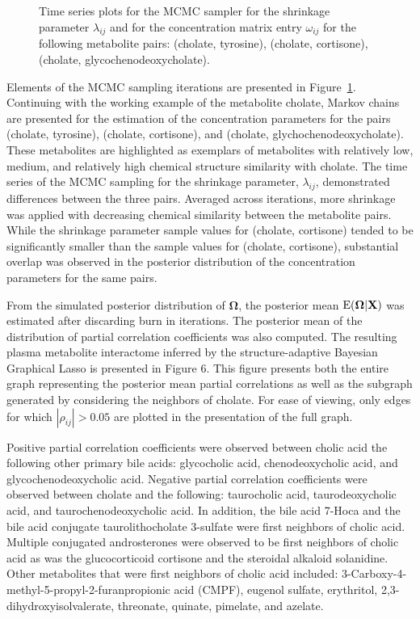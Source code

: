 \begin{figure}[h!]
	\caption[Add caption]{Time series plots for the MCMC sampler for the shrinkage parameter $\lambda_{ij}$ and for the concentration matrix entry $\omega_{ij}$ for the following metabolite pairs: (cholate, tyrosine), (cholate, cortisone), (cholate, glycochenodeoxycholate).  \label{fig:mcmc} }
\end{figure}

Elements of the MCMC sampling iterations are presented in Figure~\ref{fig:mcmc}. Continuing with the working example of the metabolite cholate, Markov chains are presented for the estimation of the concentration parameters for the pairs (cholate, tyrosine), (cholate, cortisone), and (cholate, glychochenodeoxycholate). These metabolites are highlighted as exemplars of metabolites with relatively low, medium, and relatively high chemical structure similarity with cholate. The time series of the MCMC sampling for the shrinkage parameter, $\lambda_{ij}$, demonstrated differences between the three pairs. Averaged across iterations, more shrinkage was applied with decreasing chemical similarity between the metabolite pairs. While the shrinkage parameter sample values for (cholate, cortisone) tended to be significantly smaller than the sample values for (cholate, cortisone), substantial overlap was observed in the posterior distribution of the concentration parameters for the same pairs.

From the simulated posterior distribution of $\boldsymbol{\Omega}$, the posterior mean $\operatorname{E}(\boldsymbol{\Omega}|\textbf{X})$ was estimated after discarding burn in iterations. The posterior mean of the distribution of partial correlation coefficients was also computed. The resulting plasma metabolite interactome inferred by the structure-adaptive Bayesian Graphical Lasso is presented in Figure 6. This figure presents both the entire graph representing the posterior mean partial correlations as well as the subgraph generated by considering the neighbors of cholate. For ease of viewing, only edges for which $|\rho_{ij}|>0.05$ are plotted in the presentation of the full graph. 

Positive partial correlation coefficients were observed between cholic acid the following other primary bile acids: glycocholic acid, chenodeoxycholic acid, and glycochenodeoxycholic acid. Negative partial correlation coefficients were observed between cholate and the following: taurocholic acid, taurodeoxycholic acid, and taurochenodeoxycholic acid. In addition, the bile acid 7-Hoca and the bile acid conjugate taurolithocholate 3-sulfate were first neighbors of cholic acid. Multiple conjugated androsterones were observed to be first neighbors of cholic acid as was the glucocorticoid cortisone and the steroidal alkaloid solanidine. Other metabolites that were first neighbors of cholic acid included: 3-Carboxy-4-methyl-5-propyl-2-furanpropionic acid (CMPF), eugenol sulfate, erythritol, 2,3-dihydroxyisolvalerate, threonate, quinate, pimelate, and azelate.
